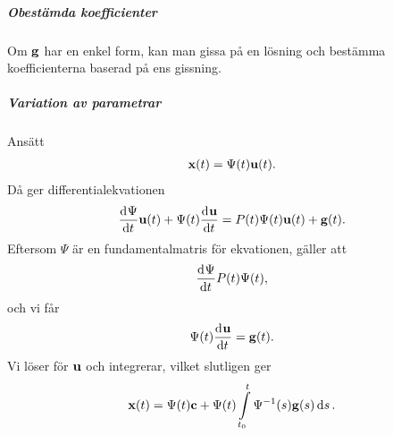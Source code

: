 \subparagraph{Obestämda koefficienter}
Om $\vb{g}$ har en enkel form, kan man gissa på en lösning och bestämma koefficienterna baserad på ens gissning.

\subparagraph{Variation av parametrar}
Ansätt
\begin{align*}
	\vb{x}(t) = \Psi(t)\vb{u}(t).
\end{align*}
Då ger differentialekvationen
\begin{align*}
	\dv[]{\Psi}{t} (t)\vb{u}(t) + \Psi(t)\dv[]{\vb{u}}{t} (t) = P(t)\Psi(t)\vb{u}(t) + \vb{g}(t).
\end{align*}
Eftersom $\Psi$ är en fundamentalmatris för ekvationen, gäller att
\begin{align*}
	\dv[]{\Psi}{t} (t)P(t)\Psi(t),
\end{align*}
och vi får
\begin{align*}
	\Psi(t)\dv[]{\vb{u}}{t} (t) = \vb{g}(t).
\end{align*}
Vi löser för $\vb{u}$ och integrerar, vilket slutligen ger
\begin{align*}
	\vb{x}(t) = \Psi(t)\vb{c} + \Psi(t)\int\limits_{t_{0}}^{t}\Psi^{-1}(s)\vb{g}(s)\dd{s}.
\end{align*}